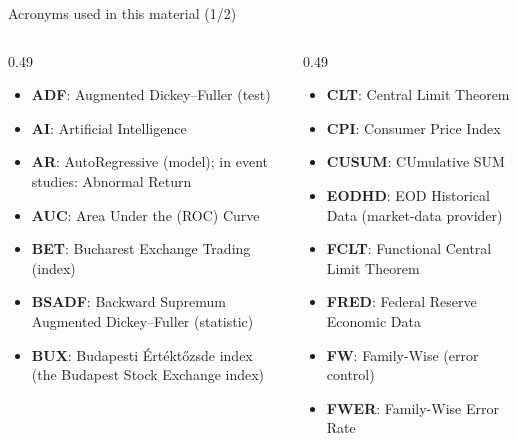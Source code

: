 \begin{frame}{Acronyms used in this material (1/2)}
\begin{columns}[T]
\begin{column}{0.49\textwidth}
\begin{itemize}\setlength{\itemsep}{0pt}
    \item \textbf{ADF}: Augmented Dickey–Fuller (test)
    \item \textbf{AI}: Artificial Intelligence
    \item \textbf{AR}: AutoRegressive (model); in event studies: Abnormal Return
    \item \textbf{AUC}: Area Under the (ROC) Curve
    \item \textbf{BET}: Bucharest Exchange Trading (index)
    \item \textbf{BSADF}: Backward Supremum Augmented Dickey–Fuller (statistic)
    \item \textbf{BUX}: Budapesti Értéktőzsde index (the Budapest Stock Exchange index)
\end{itemize}
\end{column}
\begin{column}{0.49\textwidth}
\begin{itemize}\setlength{\itemsep}{0pt}
    \item \textbf{CLT}: Central Limit Theorem
    \item \textbf{CPI}: Consumer Price Index
    \item \textbf{CUSUM}: CUmulative SUM
    \item \textbf{EODHD}: EOD Historical Data (market-data provider)
    \item \textbf{FCLT}: Functional Central Limit Theorem
    \item \textbf{FRED}: Federal Reserve Economic Data
    \item \textbf{FW}: Family-Wise (error control)
    \item \textbf{FWER}: Family-Wise Error Rate
\end{itemize}
\end{column}
\end{columns}
\end{frame}
